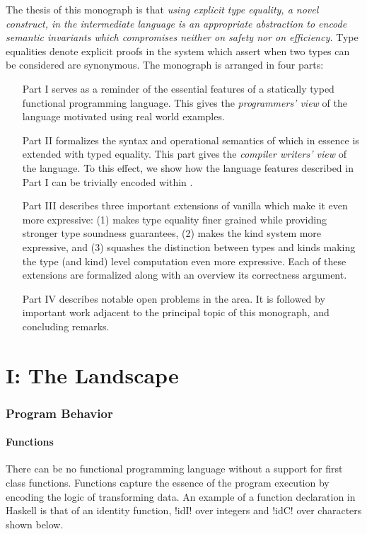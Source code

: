 \documentclass[screen,nonacm,manuscript,review]{acmart} %
\begin{document}
The thesis of this monograph is that \emph{using explicit type
  equality, a novel construct, in the intermediate language is an
  appropriate abstraction to encode semantic invariants which
  compromises neither on safety nor on efficiency.}
Type equalities denote explicit proofs in the system which assert when
two types can be considered are synonymous. The monograph
is arranged in four parts:
\begin{enumerate}
\item[Part I] serves as a reminder of the essential features
  of a statically typed functional programming language. This gives
  the \emph{programmers' view} of the language motivated using real
  world examples.
\item[Part II] formalizes the syntax and operational semantics of
  \SFC which in essence is \SF extended with typed equality. This part
  gives the \emph{compiler writers' view} of the language. To this
  effect, we show how the language features described in Part I can be
  trivially encoded within \SFC.
\item[Part III] describes three important extensions of vanilla \SFC
  which make it even more expressive:
  (1) \SFR makes type equality finer grained while
  providing stronger type soundness guarantees, (2) \SFP makes the kind
  system more expressive, and (3) \SFK squashes the distinction between
  types and kinds making the type (and kind) level computation even
  more expressive. Each of these extensions are formalized along with
  an overview its correctness argument.
\item[Part IV] describes notable open problems in the area.
  It is followed by important work adjacent to the principal topic
  of this monograph, and concluding remarks.
\end{enumerate}

\part{I: The Landscape}\label{part:I}%
\section{Program Behavior}
\subsection{Functions}
There can be no functional programming language without a support for first class
functions. Functions capture the essence of the program execution by encoding the logic of
transforming data. An example of a function declaration in Haskell is that of an identity
function, !idI! over integers and !idC! over characters shown below.
\end{document}
